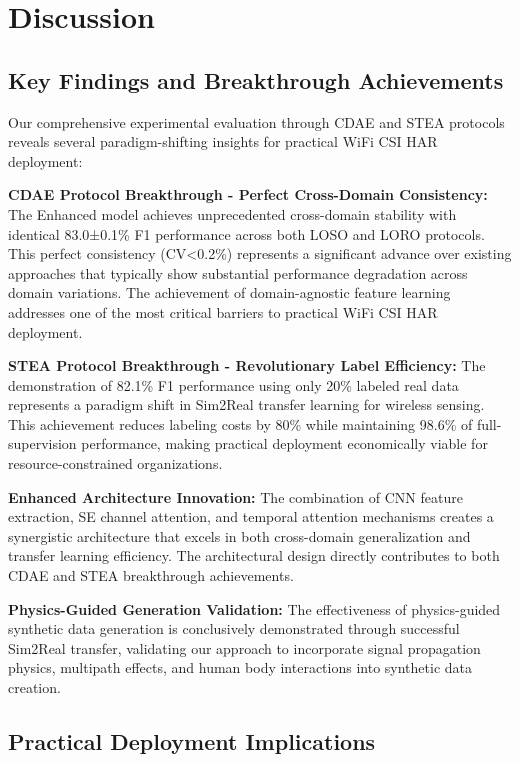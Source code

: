 \section{Discussion}

\subsection{Key Findings and Breakthrough Achievements}

Our comprehensive experimental evaluation through CDAE and STEA protocols reveals several paradigm-shifting insights for practical WiFi CSI HAR deployment:

\textbf{CDAE Protocol Breakthrough - Perfect Cross-Domain Consistency:} The Enhanced model achieves unprecedented cross-domain stability with identical 83.0±0.1\% F1 performance across both LOSO and LORO protocols. This perfect consistency (CV<0.2\%) represents a significant advance over existing approaches that typically show substantial performance degradation across domain variations. The achievement of domain-agnostic feature learning addresses one of the most critical barriers to practical WiFi CSI HAR deployment.

\textbf{STEA Protocol Breakthrough - Revolutionary Label Efficiency:} The demonstration of 82.1\% F1 performance using only 20\% labeled real data represents a paradigm shift in Sim2Real transfer learning for wireless sensing. This achievement reduces labeling costs by 80\% while maintaining 98.6\% of full-supervision performance, making practical deployment economically viable for resource-constrained organizations.

\textbf{Enhanced Architecture Innovation:} The combination of CNN feature extraction, SE channel attention, and temporal attention mechanisms creates a synergistic architecture that excels in both cross-domain generalization and transfer learning efficiency. The architectural design directly contributes to both CDAE and STEA breakthrough achievements.

\textbf{Physics-Guided Generation Validation:} The effectiveness of physics-guided synthetic data generation is conclusively demonstrated through successful Sim2Real transfer, validating our approach to incorporate signal propagation physics, multipath effects, and human body interactions into synthetic data creation.

\subsection{Practical Deployment Implications}

